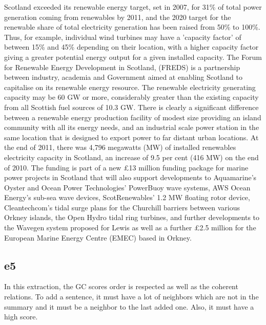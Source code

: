 \begin{tcolorbox}\footnotesize
	Scotland exceeded its renewable energy target, set in 2007, for 31\% of total power generation coming from renewables by 2011, and the 2020 target for the renewable share of total electricity generation has been raised from 50\% to 100\%.
	Thus, for example, individual wind turbines may have a 'capacity factor' of between 15\% and 45\% depending on their location, with a higher capacity factor giving a greater potential energy output for a given installed capacity.
	The Forum for Renewable Energy Development in Scotland, (FREDS) is a partnership between industry, academia and Government aimed at enabling Scotland to capitalise on its renewable energy resource.
	The renewable electricity generating capacity may be 60 GW or more, considerably greater than the existing capacity from all Scottish fuel sources of 10.3 GW.
	There is clearly a significant difference between a renewable energy production facility of modest size providing an island community with all its energy needs, and an industrial scale power station in the same location that is designed to export power to far distant urban locations.
	At the end of 2011, there was 4,796 megawatts (MW) of installed renewables electricity capacity in Scotland, an increase of 9.5 per cent (416 MW) on the end of 2010.
	The funding is part of a new £13 million funding package for marine power projects in Scotland that will also support developments to Aquamarine's Oyster and Ocean Power Technologies' PowerBuoy wave systems, AWS Ocean Energy's sub-sea wave devices, ScotRenewables' 1.2 MW floating rotor device, Cleantechcom's tidal surge plans for the Churchill barriers between various Orkney islands, the Open Hydro tidal ring turbines, and further developments to the Wavegen system proposed for Lewis as well as a further £2.5 million for the European Marine Energy Centre (EMEC) based in Orkney.
\end{tcolorbox}

\subsection{e5}

In this extraction, the GC scores order is respected as well as the coherent relations.
To add a sentence, it must have a lot of neighbors which are not in the summary and it must be a neighbor to the last added one.
Also, it must have a high score.

